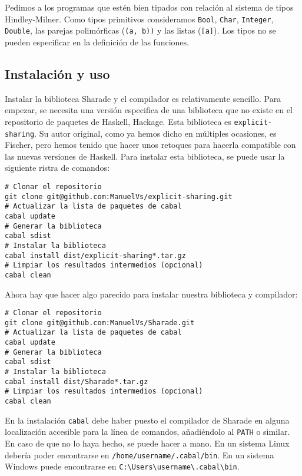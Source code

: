\documentclass[class=article, crop=false]{standalone}
\begin{document}
Pedimos a los programas que estén bien tipados con relación al sistema de tipos
Hindley-Milner. Como tipos primitivos consideramos \verb`Bool`, \verb`Char`, \verb`Integer`,
\verb`Double`, las parejas polimórficas (\verb`(a, b))` y las listas (\verb`[a]`). Los tipos
no se pueden especificar en la definición de las funciones.

\subsection{Instalación y uso}

Instalar la biblioteca Sharade y el compilador es relativamente sencillo. Para empezar, se
necesita una versión especifica de una biblioteca que no existe en el repositorio de paquetes
de Haskell, Hackage. Esta biblioteca es \verb`explicit-sharing`. Su autor original, como ya
hemos dicho en múltiples ocasiones, es Fischer, pero hemos tenido que hacer unos retoques
para hacerla compatible con las nuevas versiones de Haskell. Para instalar esta biblioteca,
se puede usar la siguiente ristra de comandos:

\begin{verbatim}
# Clonar el repositorio
git clone git@github.com:ManuelVs/explicit-sharing.git
# Actualizar la lista de paquetes de cabal
cabal update
# Generar la biblioteca
cabal sdist
# Instalar la biblioteca
cabal install dist/explicit-sharing*.tar.gz
# Limpiar los resultados intermedios (opcional)
cabal clean
\end{verbatim}

Ahora hay que hacer algo parecido para instalar nuestra biblioteca y compilador:

\begin{verbatim}
# Clonar el repositorio
git clone git@github.com:ManuelVs/Sharade.git
# Actualizar la lista de paquetes de cabal
cabal update
# Generar la biblioteca
cabal sdist
# Instalar la biblioteca
cabal install dist/Sharade*.tar.gz
# Limpiar los resultados intermedios (opcional)
cabal clean
\end{verbatim}

En la instalación \verb`cabal` debe haber puesto el compilador de Sharade en alguna
localización accesible para la línea de comandos, añadiéndolo al \verb`PATH` o similar. En
caso de que no lo haya hecho, se puede hacer a mano. En un sistema Linux debería poder
encontrarse en \verb`/home/username/.cabal/bin`. En un sistema Windows puede encontrarse en
\verb`C:\Users\username\.cabal\bin`.
\end{document}
